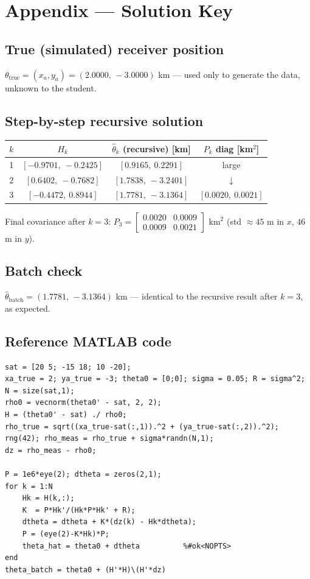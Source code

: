 \documentclass[11pt]{article}
\newcommand{\true}{\text{true}}
\begin{document}
\clearpage
\section*{\textcolor{red!60!black}{Appendix --- Solution Key}}
\noindent{\itshape\textcolor{red!60!black}{(for the instructor --- remove before distributing to students)}}

\subsection*{True (simulated) receiver position}
$\theta_{\true} = (x_a,y_a) = (2.0000,\, -3.0000)$ km --- used only to generate the data, unknown to the
student.

\subsection*{Step-by-step recursive solution}

\begin{table}[h]
\centering
\begin{tabular}{@{}cccc@{}}
\toprule
$k$ & $H_k$ & $\hat\theta_k$ (recursive) [km] & $P_k$ diag [km$^2$] \\
\midrule
1 & $[-0.9701,\ -0.2425]$ & $[0.9165,\ 0.2291]$   & large \\
2 & $[0.6402,\ -0.7682]$  & $[1.7838,\ -3.2401]$  & $\downarrow$ \\
3 & $[-0.4472,\ 0.8944]$  & $[1.7781,\ -3.1364]$  & $[0.0020,\ 0.0021]$ \\
\bottomrule
\end{tabular}
\end{table}

\noindent Final covariance after $k=3$:
$P_3 = \begin{bmatrix} 0.0020 & 0.0009 \\ 0.0009 & 0.0021 \end{bmatrix}$ km$^2$
(std $\approx 45$ m in $x$, $46$ m in $y$).

\subsection*{Batch check}
$\hat\theta_{\text{batch}} = (1.7781,\, -3.1364)$ km --- identical to the recursive result after
$k=3$, as expected.

\subsection*{Reference MATLAB code}
\begin{lstlisting}[style=matlab]
sat = [20 5; -15 18; 10 -20];
xa_true = 2; ya_true = -3; theta0 = [0;0]; sigma = 0.05; R = sigma^2;
N = size(sat,1);
rho0 = vecnorm(theta0' - sat, 2, 2);
H = (theta0' - sat) ./ rho0;
rho_true = sqrt((xa_true-sat(:,1)).^2 + (ya_true-sat(:,2)).^2);
rng(42); rho_meas = rho_true + sigma*randn(N,1);
dz = rho_meas - rho0;

P = 1e6*eye(2); dtheta = zeros(2,1);
for k = 1:N
    Hk = H(k,:);
    K  = P*Hk'/(Hk*P*Hk' + R);
    dtheta = dtheta + K*(dz(k) - Hk*dtheta);
    P = (eye(2)-K*Hk)*P;
    theta_hat = theta0 + dtheta          %#ok<NOPTS>
end
theta_batch = theta0 + (H'*H)\(H'*dz)
\end{lstlisting}
\end{document}
